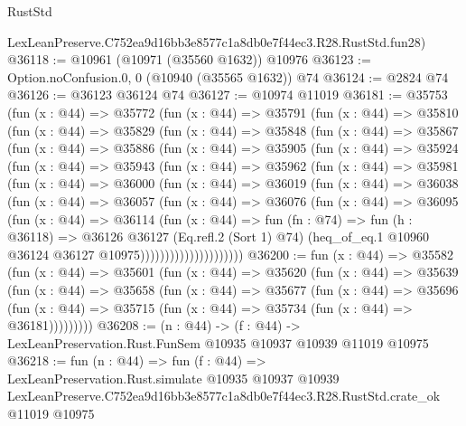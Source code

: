 \begin{lexlean}{RustStd}
\begin{coremodule}
    LexLeanPreserve.C752ea9d16bb3e8577c1a8db0e7f44ec3.R28.RustStd.fun28)
@36118 := @10961 (@10971 (@35560 @1632)) @10976
@36123 := Option.noConfusion.{0, 0} (@10940 (@35565 @1632)) @74
@36124 := @2824 @74
@36126 := @36123 @36124 @74
@36127 := @10974 @11019
@36181 := @35753
    (fun (x : @44) =>
    @35772
      (fun (x : @44) =>
      @35791
        (fun (x : @44) =>
        @35810
          (fun (x : @44) =>
          @35829
            (fun (x : @44) =>
            @35848
              (fun (x : @44) =>
              @35867
                (fun (x : @44) =>
                @35886
                  (fun (x : @44) =>
                  @35905
                    (fun (x : @44) =>
                    @35924
                      (fun (x : @44) =>
                      @35943
                        (fun (x : @44) =>
                        @35962
                          (fun (x : @44) =>
                          @35981
                            (fun (x : @44) =>
                            @36000
                              (fun (x : @44) =>
                              @36019
                                (fun (x : @44) =>
                                @36038
                                  (fun (x : @44) =>
                                  @36057
                                    (fun (x : @44) =>
                                    @36076
                                      (fun (x : @44) =>
                                      @36095
                                        (fun (x : @44) =>
                                        @36114
                                          (fun (x : @44) =>
                                          fun (fn : @74) =>
                                          fun (h : @36118) =>
                                          @36126
                                            @36127
                                            (Eq.refl.{2} (Sort 1) @74)
                                            (heq_of_eq.{1}
                                              @10960
                                              @36124
                                              @36127
                                              @10975)))))))))))))))))))))
@36200 := fun (x : @44) =>
  @35582
    (fun (x : @44) =>
    @35601
      (fun (x : @44) =>
      @35620
        (fun (x : @44) =>
        @35639
          (fun (x : @44) =>
          @35658
            (fun (x : @44) =>
            @35677
              (fun (x : @44) =>
              @35696
                (fun (x : @44) => @35715 (fun (x : @44) => @35734 (fun (x : @44) => @36181)))))))))
@36208 := (n : @44) ->
  (f : @44) -> LexLeanPreservation.Rust.FunSem @10935 @10937 @10939 @11019 @10975
@36218 := fun (n : @44) =>
  fun (f : @44) =>
  LexLeanPreservation.Rust.simulate
    @10935
    @10937
    @10939
    LexLeanPreserve.C752ea9d16bb3e8577c1a8db0e7f44ec3.R28.RustStd.crate_ok
    @11019
    @10975
\end{coremodule}
\end{lexlean}
